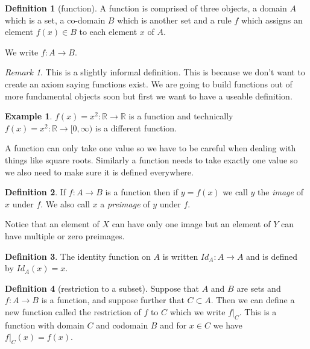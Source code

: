 \documentclass[
]{book}
\theoremstyle{definition}
\newtheorem{definition}{Definition}[chapter]
\theoremstyle{definition}
\newtheorem{example}{Example}[chapter]
\theoremstyle{definition}
\theoremstyle{definition}
\theoremstyle{remark}
\newtheorem*{remark}{Remark}
\begin{document}
\begin{definition}[function]
A function is comprised of three objects, a domain \(A\) which is a set, a co-domain \(B\) which is another set and a rule \(f\) which assigns an element \(f(x) \in B\) to each element \(x\) of \(A\).

We write \(f: A \rightarrow B\).
\end{definition}

\begin{remark}
This is a slightly informal definition. This is because we don't want to create an axiom saying functions exist. We are going to build functions out of more fundamental objects soon but first we want to have a useable definition.
\end{remark}

\begin{example}
\(f(x) = x^2 : \mathbb{R} \rightarrow \mathbb{R}\) is a function and technically \(f(x) = x^2: \mathbb{R} \rightarrow [0,\infty)\) is a different function.
\end{example}

A function can only take one value so we have to be careful when dealing with things like square roots. Similarly a function needs to take exactly one value so we also need to make sure it is defined everywhere.

\begin{definition}
If \(f: A \rightarrow B\) is a function then if \(y = f(x)\) we call \(y\) the \emph{image} of \(x\) under \(f\). We also call \(x\) a \emph{preimage} of \(y\) under \(f\).

Notice that an element of \(X\) can have only one image but an element of \(Y\) can have multiple or zero preimages.
\end{definition}

\begin{definition}
The identity function on \(A\) is written \(Id_A : A \rightarrow A\) and is defined by \(Id_A(x)=x\).
\end{definition}

\begin{definition}[restriction to a subset]
Suppose that \(A\) and \(B\) are sets and \(f : A \rightarrow B\) is a function, and suppose further that \(C \subset A\). Then we can define a new function called the restriction of \(f\) to \(C\) which we write \(f|_C\). This is a function with domain \(C\) and codomain \(B\) and for \(x \in C\) we have \(f|_C(x) = f(x)\).
\end{definition}
\end{document}
